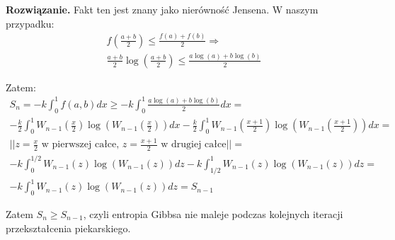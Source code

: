 \documentclass[11pt,a4paper]{article}
\newenvironment{solution}{\vspace{1cm} \par\textbf{Rozwiązanie.} \vspace{1cm}}{}
\begin{document}
\begin{solution}
Fakt ten jest znany jako nierówność Jensena. W naszym przypadku:
\begin{align*}
f\left(\frac{a + b}{2}\right) \leq \frac{f(a) + f(b)}{2} \Rightarrow \\
\frac{a + b}{2} \log\left( \frac{a + b}{2} \right) \leq \frac{a\log(a) + b\log(b)}{2}
\end{align*}

Zatem:
\begin{align*}
S_n = -k\int_0^1 f(a, b) dx \geq -k\int_0^1 \frac{a\log(a) + b\log(b)}{2} dx = \\
-\frac{k}{2} \int_0^1 W_{n-1}\left(\frac{x}{2}\right) \log\left(W_{n-1}\left(\frac{x}{2}\right)\right) dx - 
\frac{k}{2} \int_0^1 W_{n-1}\left(\frac{x+1}{2}\right) \log\left(W_{n-1}\left(\frac{x+1}{2}\right)\right) dx = \\
|| z = \frac{x}{2} \text{ w pierwszej całce, } z = \frac{x+1}{2} \text{ w drugiej całce} || = \\
-k\int_0^{1/2} W_{n-1}(z) \log\left(W_{n-1}(z)\right) dz -k \int_{1/2}^1 W_{n-1}(z) \log\left(W_{n-1}(z)\right) dz = \\
-k\int_0^1 W_{n-1}(z) \log\left(W_{n-1}(z)\right) dz =
S_{n-1}
\end{align*}

Zatem $S_n \geq S_{n-1}$, czyli entropia Gibbsa nie maleje podczas kolejnych iteracji 
przekształcenia piekarskiego.


\newpage
\end{solution}
\end{document}
